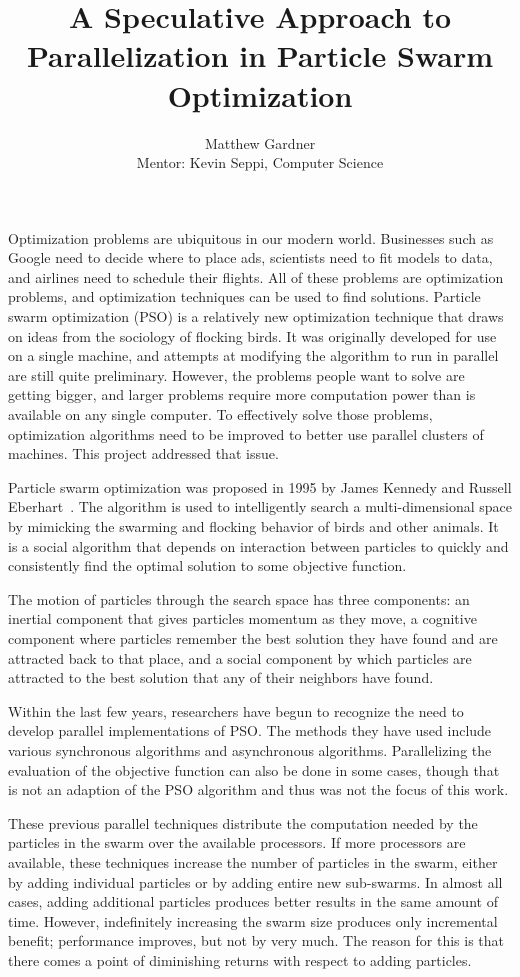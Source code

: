 \documentclass[onecolumn, 12pt]{article}
\title{A Speculative Approach to Parallelization in Particle Swarm Optimization}
\author{Matthew Gardner\\Mentor: Kevin Seppi, Computer Science}
\date{}
\begin{document}
\maketitle

Optimization problems are ubiquitous in our modern world.  Businesses such as
Google need to decide where to place ads, scientists need to fit models to
data, and airlines need to schedule their flights.  All of these problems are
optimization problems, and optimization techniques can be used to find
solutions.  Particle swarm optimization (PSO) is a relatively new optimization
technique that draws on ideas from the sociology of flocking birds.  It was
originally developed for use on a single machine, and attempts at modifying the
algorithm to run in parallel are still quite preliminary.  However, the
problems people want to solve are getting bigger, and larger problems require
more computation power than is available on any single computer.  To
effectively solve those problems, optimization algorithms need to be improved
to better use parallel clusters of machines.  This project addressed that
issue.

Particle swarm optimization was proposed in 1995 by James Kennedy and Russell
Eberhart~\cite{kennedy-1995-particle-swarm-optimization}.  The algorithm is
used to intelligently search a multi-dimensional space by mimicking the
swarming and flocking behavior of birds and other animals. It is a social
algorithm that depends on interaction between particles to quickly and
consistently find the optimal solution to some objective function.

The motion of particles through the search space has three components: an
inertial component that gives particles momentum as they move, a cognitive
component where particles remember the best solution they have found and are
attracted back to that place, and a social component by which particles are
attracted to the best solution that any of their neighbors have found.

Within the last few years, researchers have begun to recognize the need to
develop parallel implementations of PSO.  The methods they have used include
various synchronous algorithms and asynchronous algorithms.  Parallelizing the
evaluation of the objective function can also be done in some cases, though
that is not an adaption of the PSO algorithm and thus was not the focus of this
work.

These previous parallel techniques distribute the computation needed by the
particles in the swarm over the available processors.  If more processors are
available, these techniques increase the number of particles in the swarm,
either by adding individual particles or by adding entire new sub-swarms.  In
almost all cases, adding additional particles produces better results in the
same amount of time.  However, indefinitely increasing the swarm size produces
only incremental benefit; performance improves, but not by very much.  The
reason for this is that there comes a point of diminishing returns with respect
to adding particles.
\end{document}
